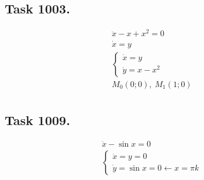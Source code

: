 \documentclass{article}
\begin{document}
\subsection*{Task 1003.}

\addtolength{\jot}{1pt}
\begin{fleqn}[1\parindent]
  \begin{gather*}
    \ddot{x}-x+x^2=0 \\ 
    \dot{x}=y \\ 
    \begin{cases}
      \dot{x}=y \\ 
      \dot{y}=x-x^2
    \end{cases} \\
    M_0(0;0),\ M_1(1;0) \\
  \end{gather*}
\end{fleqn}

\subsection*{Task 1009.}

\addtolength{\jot}{1pt}
\begin{fleqn}[1\parindent]
  \begin{gather*}
    \ddot{x}-\sin{x}=0 \\ 
    \begin{cases}
      \dot{x}=y=0 \\ 
      \dot{y}=\sin{x}=0 \leftarrow x = \pi k
    \end{cases} \\ 
  \end{gather*}
\end{fleqn}
\end{document}
